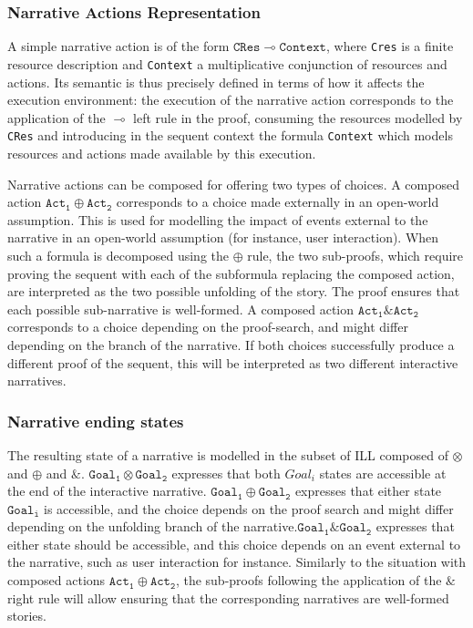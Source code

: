 \documentclass[runningheads,a4paper]{llncs}
\begin{document}
\subsubsection{Narrative Actions Representation}
A simple narrative action is of the form $\mathtt{CRes} \multimap \mathtt{Context}$, where \texttt{Cres} is a finite resource description and \texttt{Context} a multiplicative conjunction of resources and actions. Its semantic is thus precisely defined in terms of how it affects the execution environment: the execution of the narrative action corresponds to the application of the $\multimap$ left rule in the proof, consuming the resources modelled by \texttt{CRes} and introducing in the sequent context the formula \texttt{Context} which models resources and actions made available by this execution.

Narrative actions can be composed for offering two types of choices. A composed action $\mathtt{Act_{1}} \oplus \mathtt{Act_{2}}$ corresponds to a choice made externally in an open-world assumption. This is used for modelling the impact of events external to the narrative in an open-world assumption (for instance, user interaction). When such a formula is decomposed using the $\oplus$ rule, the two sub-proofs, which require proving the sequent with each of the subformula replacing the composed action, are interpreted as the two possible unfolding of the story. The proof ensures that each possible sub-narrative is well-formed. A composed action $\mathtt{Act_{1}} \& \mathtt{Act_{2}}$ corresponds to a choice depending on the proof-search, and might differ depending on the branch of the narrative. If both choices successfully produce a different proof of the sequent, this will be interpreted as two different interactive narratives.
\subsubsection{Narrative ending states}
The resulting state of a narrative is modelled in the subset of ILL composed of $\otimes$ and $\oplus$ and $\&$. 
$\mathtt{Goal_{1}} \otimes \mathtt{Goal_{2}}$ expresses that both $Goal_{i}$ states are accessible at the end of the interactive narrative. $\mathtt{Goal_{1}} \oplus \mathtt{Goal_{2}}$ expresses that either state $\mathtt{Goal_{i}}$ is accessible, and the choice depends on the proof search and might differ depending on the unfolding branch of the narrative.$\mathtt{Goal_{1}} \& \mathtt{Goal_{2}}$ expresses that either state should be accessible, and this choice depends on an event external to the narrative, such as user interaction for instance. Similarly to the situation with composed actions $\mathtt{Act_1}\oplus\mathtt{Act_2}$, the sub-proofs following the application of the $\&$ right rule will allow ensuring that the corresponding narratives are well-formed stories.
%
\end{document}
